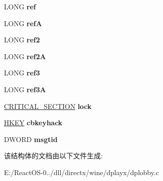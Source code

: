 \begin{DoxyCompactItemize}
L\+O\+NG {\bfseries ref}
\item 
\mbox{\label{struct_i_direct_play_lobby_impl_a8fc655ca2b5eaf74597bfb1e12c179bd}} 
L\+O\+NG {\bfseries refA}
\item 
\mbox{\label{struct_i_direct_play_lobby_impl_ad12a02dae79acba7b100d8f1f45af430}} 
L\+O\+NG {\bfseries ref2}
\item 
\mbox{\label{struct_i_direct_play_lobby_impl_ad3f35a33506c9be5ab73581bb601cfc2}} 
L\+O\+NG {\bfseries ref2A}
\item 
\mbox{\label{struct_i_direct_play_lobby_impl_a465cf69a81a66a0528b9f928b5050df6}} 
L\+O\+NG {\bfseries ref3}
\item 
\mbox{\label{struct_i_direct_play_lobby_impl_a01077099e1181d12e2a9381cb538fe07}} 
L\+O\+NG {\bfseries ref3A}
\item 
\mbox{\label{struct_i_direct_play_lobby_impl_a36fe94adf75a20ad91c085882bfd18e9}} 
\hyperlink{struct___c_r_i_t_i_c_a_l___s_e_c_t_i_o_n}{C\+R\+I\+T\+I\+C\+A\+L\+\_\+\+S\+E\+C\+T\+I\+ON} {\bfseries lock}
\item 
\mbox{\label{struct_i_direct_play_lobby_impl_a481b43eccd99f0c192ba683b8fc433e1}} 
\hyperlink{interfacevoid}{H\+K\+EY} {\bfseries cbkeyhack}
\item 
\mbox{\label{struct_i_direct_play_lobby_impl_aa1465d9a1223b7eabc52a6e3457f66a4}} 
D\+W\+O\+RD {\bfseries msgtid}
\end{DoxyCompactItemize}


该结构体的文档由以下文件生成\+:\begin{DoxyCompactItemize}
\item 
E\+:/\+React\+O\+S-\/0../dll/directx/wine/dplayx/dplobby.\+c\end{DoxyCompactItemize}
